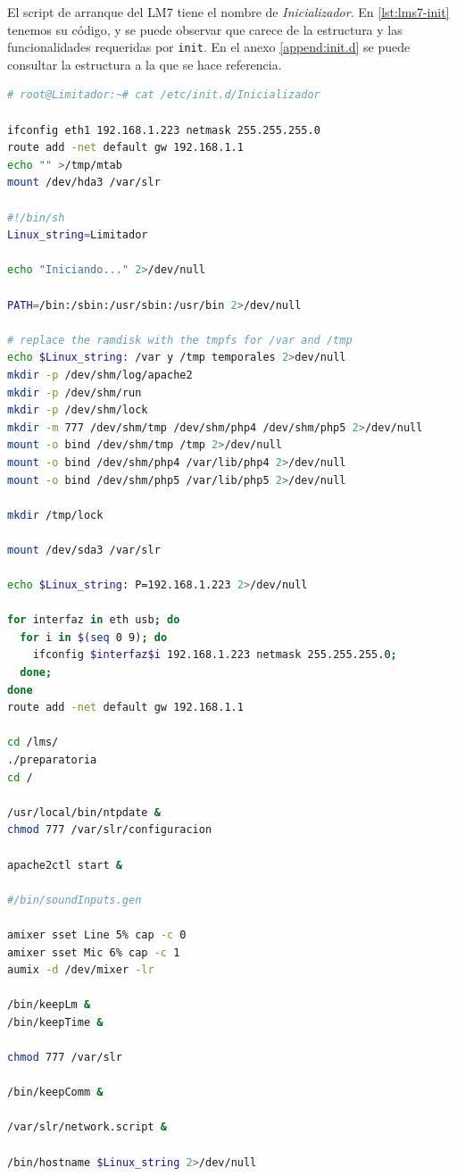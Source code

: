 El script de arranque del \acrshort{LM7} tiene el nombre de \textit{Inicializador}. En \ref{lst:lms7-init} tenemos su código, y se puede observar que carece de la estructura y las funcionalidades requeridas por \verb|init|. En el anexo \ref{append:init.d} se puede consultar la estructura a la que se hace referencia. \\

\begin{lstlisting}[language=bash, caption={Script de arranque primario del \acrshort{LM7}.}, label={lst:lms7-init}]
# root@Limitador:~# cat /etc/init.d/Inicializador

ifconfig eth1 192.168.1.223 netmask 255.255.255.0
route add -net default gw 192.168.1.1
echo "" >/tmp/mtab
mount /dev/hda3 /var/slr

#!/bin/sh
Linux_string=Limitador

echo "Iniciando..." 2>/dev/null

PATH=/bin:/sbin:/usr/sbin:/usr/bin 2>/dev/null

# replace the ramdisk with the tmpfs for /var and /tmp
echo $Linux_string: /var y /tmp temporales 2>dev/null
mkdir -p /dev/shm/log/apache2
mkdir -p /dev/shm/run
mkdir -p /dev/shm/lock
mkdir -m 777 /dev/shm/tmp /dev/shm/php4 /dev/shm/php5 2>/dev/null
mount -o bind /dev/shm/tmp /tmp 2>/dev/null
mount -o bind /dev/shm/php4 /var/lib/php4 2>/dev/null
mount -o bind /dev/shm/php5 /var/lib/php5 2>/dev/null

mkdir /tmp/lock

mount /dev/sda3 /var/slr

echo $Linux_string: P=192.168.1.223 2>/dev/null

for interfaz in eth usb; do
  for i in $(seq 0 9); do
    ifconfig $interfaz$i 192.168.1.223 netmask 255.255.255.0;
  done;
done
route add -net default gw 192.168.1.1

cd /lms/
./preparatoria
cd /

/usr/local/bin/ntpdate &
chmod 777 /var/slr/configuracion

apache2ctl start &

#/bin/soundInputs.gen

amixer sset Line 5% cap -c 0
amixer sset Mic 6% cap -c 1
aumix -d /dev/mixer -lr

/bin/keepLm &
/bin/keepTime &

chmod 777 /var/slr

/bin/keepComm &

/var/slr/network.script &

/bin/hostname $Linux_string 2>/dev/null


\end{lstlisting}
